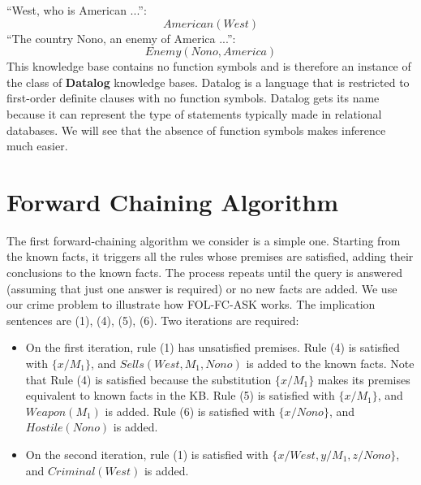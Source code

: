 “West, who is American ...”:
\begin{equation}
    American(West)
\end{equation}
“The country Nono, an enemy of America ...”:
\begin{equation}
    Enemy(Nono, America)
\end{equation}
This knowledge base contains no function symbols and is therefore an instance of the class of \textbf{Datalog} knowledge bases. Datalog is a language that is restricted to first-order definite clauses with no function symbols. Datalog gets its name because it can represent the type of statements typically made in relational databases. We will see that the absence of function symbols makes inference much easier.

\section{Forward Chaining Algorithm}
The first forward-chaining algorithm we consider is a simple one. Starting from the known facts, it triggers all the rules whose premises are satisfied, adding their conclusions to the known facts. The process repeats until the query is answered (assuming that just one answer is required) or no new facts are added. We use our crime problem to illustrate how FOL-FC-ASK works. The implication
sentences are (1), (4), (5), (6). Two iterations are required:
\begin{itemize}
    \item On the first iteration, rule (1) has unsatisfied premises.
    \newline
    Rule (4) is satisfied with $\{x/M_1\}$, and $Sells(West, M_1, Nono)$ is added to the known facts. Note that Rule (4) is satisfied because the substitution  $\{x/M_1\}$ makes its premises equivalent to known facts in the KB.
    \newline
    Rule (5) is satisfied with $\{x/M_1\}$, and $Weapon(M_1)$ is added.
    \newline
    Rule (6) is satisfied with $\{x/Nono\}$, and $Hostile(Nono)$ is added.

    \item On the second iteration, rule (1) is satisfied with $\{x/West, y/M_1, z/Nono\}$, and $Criminal(West)$ is added.
\end{itemize}
